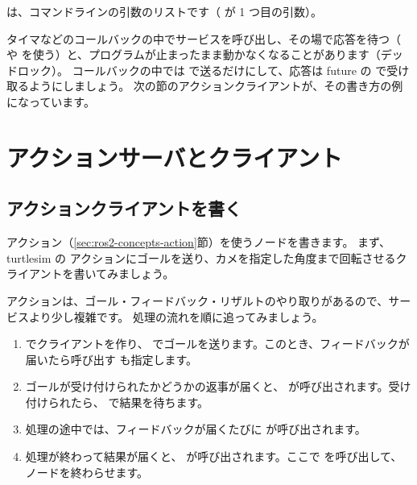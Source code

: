  は、コマンドラインの引数のリストです（ が 1 つ目の引数）。


\begin{caution}[コールバックの中でサービスの応答を待たない]
  タイマなどのコールバックの中でサービスを呼び出し、その場で応答を待つ（ や  を使う）と、プログラムが止まったまま動かなくなることがあります（デッドロック）。
  コールバックの中では  で送るだけにして、応答は future の  で受け取るようにしましょう。
  次の節のアクションクライアントが、その書き方の例になっています。
\end{caution}

\section{アクションサーバとクライアント}
\label{sec:rclpy-action}

\subsection{アクションクライアントを書く}

アクション（\ref{sec:ros2-concepts-action}節）を使うノードを書きます。
まず、turtlesim の  アクションにゴールを送り、カメを指定した角度まで回転させるクライアントを書いてみましょう。


アクションは、ゴール・フィードバック・リザルトのやり取りがあるので、サービスより少し複雑です。
処理の流れを順に追ってみましょう。

\begin{enumerate}
  \item {} でクライアントを作り、 でゴールを送ります。このとき、フィードバックが届いたら呼び出す  も指定します。
  \item ゴールが受け付けられたかどうかの返事が届くと、 が呼び出されます。受け付けられたら、 で結果を待ちます。
  \item 処理の途中では、フィードバックが届くたびに  が呼び出されます。
  \item 処理が終わって結果が届くと、 が呼び出されます。ここで  を呼び出して、ノードを終わらせます。
\end{enumerate}

